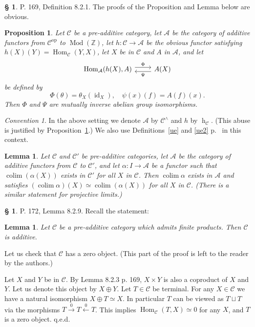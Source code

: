 \documentclass[12pt]{article}
\newtheorem{lem}[thm]{Lemma}
\newtheorem{prop}[thm]{Proposition}
\theoremstyle{remark}
\newtheorem{conv}[thm]{Convention}
\theoremstyle{definition}
\newtheorem{s}[thm]{\S}
\newcommand{\bb}{\mathbb}
\newcommand{\A}{\mathcal A}
\newcommand{\C}{\mathcal C}
\newcommand{\xl}{\xleftarrow}
\newcommand{\xr}{\xrightarrow}
\DeclareMathOperator*{\co}{colim}
\DeclareMathOperator{\hy}{h}
\DeclareMathOperator{\id}{id}
\DeclareMathOperator{\Hom}{Hom}%
\DeclareMathOperator{\Mod}{Mod}
\DeclareMathOperator{\op}{op}
\begin{document}
\begin{s} 
P. 169, Definition 8.2.1. The proofs of the Proposition and Lemma below are obvious. 
\begin{prop}\label{payp}
Let $\C$ be a pre-additive category, let $\A$ be the category of additive functors from $\C^{\op}$ to $\Mod(\bb Z)$, let $h:\C\to\A$ be the obvious functor satisfying $h(X)(Y)=\Hom_\C(Y,X)$, let $X$ be in $\C$ and $A$ in $\A$, and let 
$$
\begin{tikzcd}
\Hom_\A(h(X),A)\ar[yshift=.7ex]{r}{\Phi}&A(X)\ar[yshift=-.7ex]{l}{\Psi}
\end{tikzcd}
$$
be defined by 
$$
\Phi(\theta)=\theta_X(\id_X),\quad\psi(x)(f)=A(f)(x).
$$
Then $\Phi$ and $\Psi$ are mutually inverse abelian group isomorphisms.
\end{prop}
\begin{conv}\label{payc}
In the above setting we denote $\A$ by $\C^\wedge$ and $h$ by $\hy_\C$. (This abuse is justified by Proposition~\ref{payp}.) We also use Definitions~\ref{ue} and \ref{ue2} p.~\pageref{ue} in this context.
\end{conv} 
\begin{lem}\label{payl}
Let $\C$ and $\C'$ be pre-additive categories, let $\A$ be the category of additive functors from $\C$ to $\C'$, and let $\alpha:I\to\A$ be a functor such that $\co(\alpha(X))$ exists in $\C'$ for all $X$ in $\C$. Then $\co\alpha$ exists in $\A$ and satisfies $(\co\alpha)(X)\simeq\co(\alpha(X))$ for all $X$ in $\C$. (There is a similar statement for projective limits.)
\end{lem}
\end{s}
%
%
\begin{s} 
P. 172, Lemma 8.2.9. Recall the statement:
%
\begin{lem}
Let $\C$ be a pre-additive category which admits finite products. Then $\C$ is additive.
\end{lem}
%
Let us check that $\C$ has a zero object. (This part of the proof is left to the reader by the authors.) 

Let $X$ and $Y$ be in $\C$. By Lemma 8.2.3 p. 169, $X\times Y$ is also a coproduct of $X$ and $Y$. Let us denote this object by $X\oplus Y$. Let $T\in\C$ be terminal. For any $X\in\C$ we have a natural isomorphism $X\oplus T\simeq X$. In particular $T$ can be viewed as $T\sqcup T$ via the morphisms $T\xr0T\xl0T$. This implies $\Hom_\C(T,X)\simeq0$ for any $X$, and $T$ is a zero object. q.e.d.
\end{s}
%
%
\end{document}
